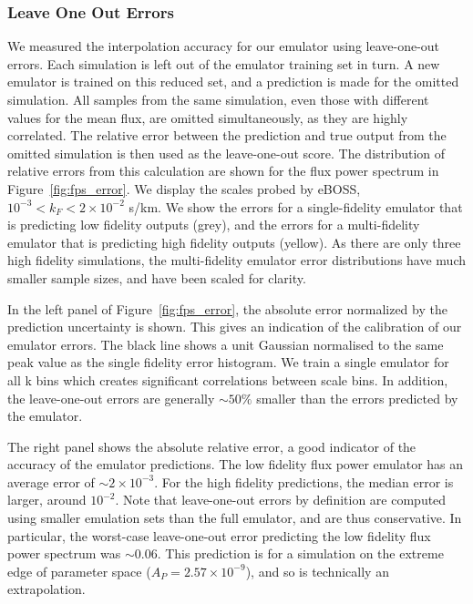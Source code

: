 \documentclass[a4paper,11pt]{article}
\begin{document}
\subsubsection{Leave One Out Errors}

We measured the interpolation accuracy for our emulator using leave-one-out errors. Each simulation is left out of the emulator training set in turn. A new emulator is trained on this reduced set, and a prediction is made for the omitted simulation. All samples from the same simulation, even those with different values for the mean flux, are omitted simultaneously, as they are highly correlated. The relative error between the prediction and true output from the omitted simulation is then used as the leave-one-out score.
The distribution of relative errors from this calculation are shown for the flux power spectrum in Figure~\ref{fig:fps_error}. We display the scales probed by eBOSS, $10^{-3} < k_F < 2 \times 10^{-2}$ s/km.
We show the errors for a single-fidelity emulator that is predicting low fidelity outputs (grey), and the errors for a multi-fidelity emulator that is predicting high fidelity outputs (yellow). As there are only three high fidelity simulations, the multi-fidelity emulator error distributions have much smaller sample sizes, and have been scaled for clarity.

In the left panel of Figure~\ref{fig:fps_error}, the absolute error normalized by the prediction uncertainty is shown. This gives an indication of the calibration of our emulator errors. The black line shows a unit Gaussian normalised to the same peak value as the single fidelity error histogram. We train a single emulator for all k bins which creates significant correlations between scale bins. In addition, the leave-one-out errors are generally $\sim 50\%$ smaller than the errors predicted by the emulator.

The right panel shows the absolute relative error, a good indicator of the accuracy of the emulator predictions.
The low fidelity flux power emulator has an average error of $\sim 2\times 10^{-3}$. For the high fidelity predictions, the median error is larger, around $10^{-2}$. Note that leave-one-out errors by definition are computed using smaller emulation sets than the full emulator, and are thus conservative. In particular, the worst-case leave-one-out error predicting the low fidelity flux power spectrum was $\sim 0.06$. This prediction is for a simulation on the extreme edge of parameter space ($A_P = 2.57\times10^{-9}$), and so is technically an extrapolation.
\end{document}
